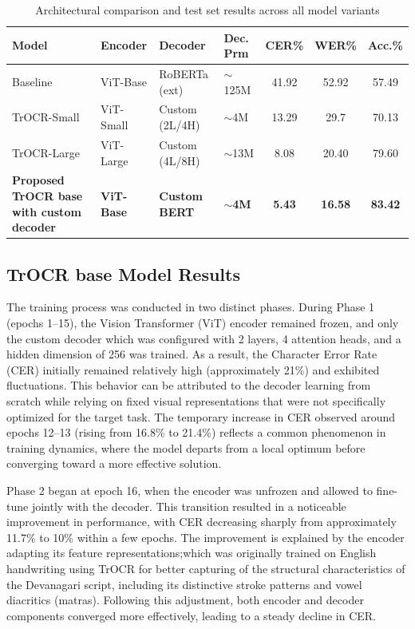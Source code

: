 \begin{table}[H]
\centering
\vspace{8pt}
\renewcommand{\arraystretch}{1.9}
\begin{tabular}{|p{2.4cm}|p{1.8cm}|p{3.2cm}|p{1.8cm}|c|c|c|}
\hline
\textbf{Model} & \textbf{Encoder} & \textbf{Decoder} & \textbf{Dec. Prm} & \textbf{CER\%} & \textbf{WER\%} & \textbf{Acc.\%} \\ \hline
Baseline & ViT-Base & RoBERTa (ext) & $\sim$125M & 41.92 & 52.92 & 57.49 \\ \hline
TrOCR-Small & ViT-Small & Custom (2L/4H) & $\sim$4M & 13.29 & 29.7 & 70.13 \\ \hline
TrOCR-Large & ViT-Large & Custom (4L/8H) & $\sim$13M & 8.08& 20.40 & 79.60 \\ \hline
\textbf{Proposed TrOCR base with custom decoder} & \textbf{ViT-Base} & \textbf{Custom BERT} & \textbf{$\sim$4M} & \textbf{5.43} & \textbf{16.58} & \textbf{83.42} \\ \hline
\end{tabular}
\caption{Architectural comparison and test set results across all model variants}
\label{tab:model_variants}
\end{table}

\subsection{TrOCR base Model Results}
The training process was conducted in two distinct phases. During Phase 1 (epochs 1–15), the Vision Transformer (ViT) encoder remained frozen, and only the custom decoder which was configured with 2 layers, 4 attention heads, and a hidden dimension of 256 was trained. As a result, the Character Error Rate (CER) initially remained relatively high (approximately 21\%) and exhibited fluctuations. This behavior can be attributed to the decoder learning from scratch while relying on fixed visual representations that were not specifically optimized for the target task. The temporary increase in CER observed around epochs 12–13 (rising from 16.8\% to 21.4\%) reflects a common phenomenon in training dynamics, where the model departs from a local optimum before converging toward a more effective solution.

\noindent Phase 2 began at epoch 16, when the encoder was unfrozen and allowed to fine-tune jointly with the decoder. This transition resulted in a noticeable improvement in performance, with CER decreasing sharply from approximately 11.7\% to 10\% within a few epochs. The improvement is explained by the encoder adapting its feature representations;which was originally trained on English handwriting using TrOCR for better capturing of the structural characteristics of the Devanagari script, including its distinctive stroke patterns and vowel diacritics (matras). Following this adjustment, both encoder and decoder components converged more effectively, leading to a steady decline in CER.

